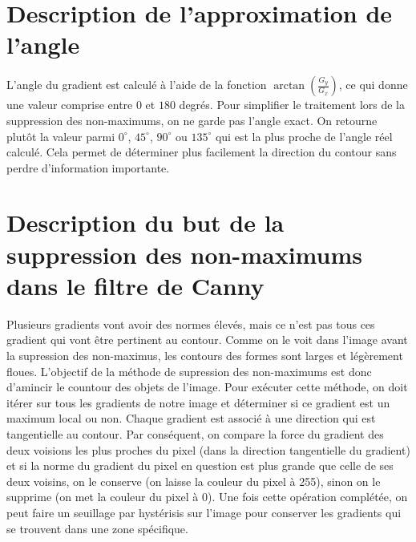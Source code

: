 \documentclass{article}
\begin{document}
\section{Description de l’approximation de l’angle}

L’angle du gradient est calculé à l’aide de la fonction \(\arctan\left(\frac{G_y}{G_x}\right)\), ce qui donne une valeur comprise entre \(0\) et \(180\) degrés.  
Pour simplifier le traitement lors de la suppression des non-maximums, on ne garde pas l’angle exact.  
On retourne plutôt la valeur parmi \(0^\circ\), \(45^\circ\), \(90^\circ\) ou \(135^\circ\) qui est la plus proche de l’angle réel calculé.  
Cela permet de déterminer plus facilement la direction du contour sans perdre d’information importante.

\section{Description du but de la suppression des non-maximums dans le filtre de Canny}
Plusieurs gradients vont avoir des normes élevés, mais ce n'est pas tous ces gradient qui vont être pertinent au contour. Comme on le voit dans 
l'image avant la supression des non-maximus, les contours des formes sont larges et légèrement floues. L'objectif de la méthode
de supression des non-maximums est donc d'amincir le countour des objets de l'image. Pour exécuter cette méthode, on doit itérer sur tous les gradients de notre
image et déterminer si ce gradient est un maximum local ou non. Chaque gradient est associé à une direction qui est tangentielle au contour. Par conséquent,
on compare la force du gradient des deux voisions les plus proches du pixel (dans la direction tangentielle du gradient) et si la norme du gradient du pixel
en question est plus grande que celle de ses deux voisins, on le conserve (on laisse la couleur du pixel à 255), sinon on le supprime (on met la couleur
du pixel à 0). Une fois cette opération complétée, on peut faire un seuillage par hystérisis sur l'image pour conserver les gradients qui se trouvent 
dans une zone spécifique.
\end{document}
